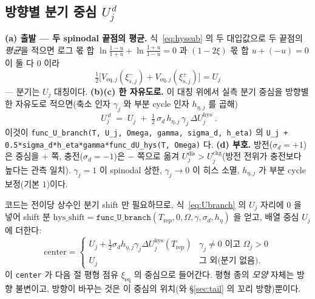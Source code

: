 \documentclass[11pt,a4paper]{article}
\newcommand{\eq}{\mathrm{eq}}
\newcommand{\dis}{\mathrm{dis}}
\newcommand{\chg}{\mathrm{chg}}
\newcommand{\hys}{\mathrm{hys}}
\newcommand{\rep}{\mathrm{rep}}
\newcommand{\code}[1]{\texttt{#1}}
\begin{document}
\subsection{방향별 분기 중심 $U_j^{\,d}$}
\textbf{(a) 출발 — 두 spinodal 끝점의 평균.} 식~\eqref{eq:hyssub} 의 두 대입값으로 두 끝점의 \emph{평균}을 적으면
로그 몫 합 $\ln\frac{1-u}{1+u}+\ln\frac{1+u}{1-u}=0$ 과 $(1-2\xi)$ 몫 합 $u+(-u)=0$ 이 둘 다 $0$ 이라
\begin{equation}
\tfrac12\big[V_{\eq,j}(\xi_{s,j}^-)+V_{\eq,j}(\xi_{s,j}^+)\big]=U_j
\label{eq:hyssym}
\end{equation}
— 분기는 $U_j$ 대칭이다. \textbf{(b)(c) 한 자유도로.} 이 대칭 위에서 실측 분기 중심을 방향별 한 자유도로 적으면(축소
인자 $\gamma_j$ 와 부분 cycle 인자 $h_{\eta,j}$ 를 곱해)
\begin{equation}
\boxed{\;U_j^{\,d}\;=\;U_j\;+\;\tfrac12\,\sigma_d\,h_{\eta,j}\,\gamma_j\,\Delta U_j^\hys\;.}
\label{eq:Ubranch}
\end{equation}
이것이 \code{func\_U\_branch(T, U\_j, Omega, gamma, sigma\_d, h\_eta)} 의
\code{U\_j + 0.5*sigma\_d*h\_eta*gamma*func\_dU\_hys(T, Omega)} 다. \textbf{(d) 부호.} 방전($\sigma_d=+1$)은 중심을
$+$ 쪽, 충전($\sigma_d=-1$)은 $-$ 쪽으로 옮겨 $U_j^{\dis}>U_j^{\chg}$(방전 전위가 충전보다 높다는 관측 일치).
$\gamma_j=1$ 이 spinodal 상한, $\gamma_j\to0$ 이 히스 소멸, $h_{\eta,j}$ 가 부분 cycle 보정(기본 $1$)이다.

코드는 전이당 상수인 분기 shift 만 필요하므로, 식~\eqref{eq:Ubranch} 의 $U_j$ 자리에 $0$ 을 넣어 shift 분
$\mathrm{hys\_shift}=\code{func\_U\_branch}(T_\rep,0,\Omega,\gamma,\sigma_d,h_\eta)$ 을 얻고, 배열 중심 $U_j$ 에 더한다:
\begin{equation}
\mathrm{center}=
\begin{cases}
U_j+\tfrac12\sigma_d h_{\eta,j}\gamma_j\Delta U_j^\hys(T_\rep) & \gamma_j\ne0 \text{ 이고 } \Omega_j>0\\[2pt]
U_j & \text{그 외(분기 없음)}.
\end{cases}
\label{eq:center}
\end{equation}
이 \code{center} 가 다음 절 평형 점유 $\xi_\eq$ 의 중심으로 들어간다. 평형 종의 \emph{모양} 자체는 방향 불변이고,
방향이 바꾸는 것은 이 중심의 위치(와 \S\ref{sec:tail} 의 꼬리 방향)뿐이다.
\end{document}
